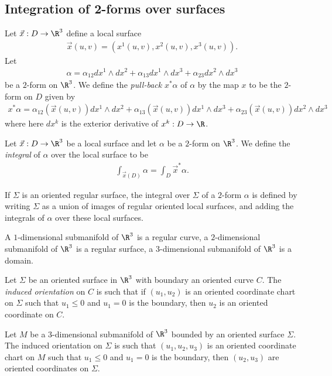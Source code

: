 \documentclass{article}
\begin{document}
\subsection{Integration of 2-forms over surfaces}

\begin{definition}
    Let $\vec x:D\to\R^3$ define a local surface 
    \begin{align*}
        \vec x(u,v)=(x^1(u,v), x^2(u,v), x^3(u,v)).
    \end{align*}
    Let 
    \begin{align*}
        \alpha = \alpha_{12}dx^1\wedge dx^2 + \alpha_{13}dx^1\wedge dx^3 + \alpha_{23}dx^2\wedge dx^3
    \end{align*}
    be a $2$-form on $\R^3$. We define the \emph{pull-back} $x^*\alpha$ of $\alpha$ by the map $x$
    to be the $2$-form on $D$ given by 
    \begin{align*}
        x^*\alpha = \alpha_{12}(\vec x(u,v))dx^1\wedge dx^2+ \alpha_{13}(\vec x(u,v))dx^1\wedge dx^3 + \alpha_{23}(\vec x(u,v))dx^2\wedge dx^3
    \end{align*}
    where here $dx^k$ is the exterior derivative of $x^k:D\to\R$.
\end{definition}

\begin{definition}
    Let $\vec x:D\to\R^3$ be a local surface and let $\alpha$ be a $2$-form on $\R^3$. We define 
    the \emph{integral} of $\alpha$ over the local surface to be 
    \begin{align*}
        \int_{\vec x(D)} \alpha = \int_D \vec x^*\alpha.
    \end{align*}
\end{definition}

\begin{definition}
    If $\Sigma$ is an oriented regular surface, the integral over $\Sigma$ of a $2$-form $\alpha$
    is defined by writing $\Sigma$ as a union of images of regular oriented local surfaces, and 
    adding the integrals of $\alpha$ over these local surfaces. 
\end{definition}

\begin{definition}
    A $1$-dimensional submanifold of $\R^3$ is a regular curve, a $2$-dimensional submanifold of 
    $\R^3$ is a regular surface, a $3$-dimensional submanifold of $\R^3$ is a domain.
\end{definition}

\begin{definition}
    Let $\Sigma$ be an oriented surface in $\R^3$ with boundary an oriented curve $C$.
    The \emph{induced orientation} on $C$ is such that if $(u_1,u_2)$ is an oriented coordinate
    chart on $\Sigma$ such that $u_1\leq 0$ and $u_1=0$ is the boundary, then $u_2$ is an
    oriented coordinate on $C$. 
    
    Let $M$ be a $3$-dimensional submanifold of $\R^3$ bounded by 
    an oriented surface $\Sigma$. The induced orientation on $\Sigma$ is such that $(u_1,u_2,u_3)$
    is an oriented coordinate chart on $M$ such that $u_1\leq 0$ and $u_1=0$ is the boundary,
    then $(u_2,u_3)$ are oriented coordinates on $\Sigma$.
\end{definition}
\end{document}
